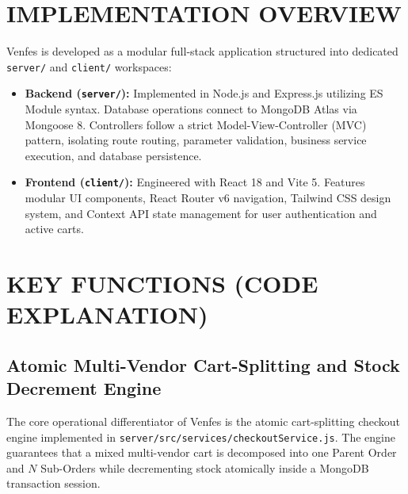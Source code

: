 \documentclass[12pt,a4paper]{report}
\begin{document}
\section{IMPLEMENTATION OVERVIEW}
Venfes is developed as a modular full-stack application structured into dedicated \texttt{server/} and \texttt{client/} workspaces:
\begin{itemize}[leftmargin=1.5cm]
    \item \textbf{Backend (\texttt{server/}):} Implemented in Node.js and Express.js utilizing ES Module syntax. Database operations connect to MongoDB Atlas via Mongoose 8. Controllers follow a strict Model-View-Controller (MVC) pattern, isolating route routing, parameter validation, business service execution, and database persistence.
    \item \textbf{Frontend (\texttt{client/}):} Engineered with React 18 and Vite 5. Features modular UI components, React Router v6 navigation, Tailwind CSS design system, and Context API state management for user authentication and active carts.
\end{itemize}

\section{KEY FUNCTIONS (CODE EXPLANATION)}

\subsection{Atomic Multi-Vendor Cart-Splitting and Stock Decrement Engine}
The core operational differentiator of Venfes is the atomic cart-splitting checkout engine implemented in \texttt{server/src/services/checkoutService.js}. The engine guarantees that a mixed multi-vendor cart is decomposed into one Parent Order and $N$ Sub-Orders while decrementing stock atomically inside a MongoDB transaction session.
\end{document}

